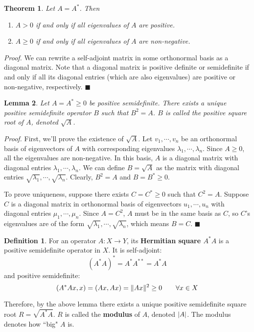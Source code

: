 \documentclass[a4paper,10pt]{book}
\theoremstyle{plain}
\newtheorem{theorem}{Theorem}[section]
\renewenvironment{proof}{\textsl{Proof.}}{\hfill$\blacksquare$}
\theoremstyle{plain}
\newtheorem{lemma}[theorem]{Lemma}
\newenvironment{lproof}{\textsl{Proof.}}{\hfill$\blacksquare$}
\theoremstyle{definition}
\newtheorem{definition}{Definition}[section]
\begin{document}
\begin{theorem}
Let $A = A^{*}$. Then 
\begin{enumerate}
	\item $A > 0$ if and only if all eigenvalues of $A$ are positive. 
	\item $A \geq 0$ if and only if all eigenvalues of $A$ are non-negative. 
\end{enumerate}
\end{theorem}

\begin{proof}
We can rewrite a self-adjoint matrix in some orthonormal basis as a diagonal matrix. Note that a diagonal matrix is positive definite or semidefinite if and only if all its diagonal entries (which are also eigenvalues) are positive or non-negative, respectively.  
\end{proof}

\begin{lemma}
Let $A = A^{*} \geq 0$ be positive semidefinite. There exists a unique positive semidefinite operator $B$ such that $B^{2} = A$. $B$ is called the positive square root of $A$, denoted $\sqrt{A}$.
\end{lemma}

\begin{lproof}
First, we'll prove the existence of $\sqrt{A}$. Let $v_{1}, \cdots, v_{n}$ be an orthonormal basis of eigenvectors of $A$ with corresponding eigenvalues $\lambda_{1}, \cdots, \lambda_{n}$. Since $A \geq 0$, all the eigenvalues are non-negative. In this basis, $A$ is a diagonal matrix with diagonal entries $\lambda_{1}, \cdots, \lambda_{n}$. We can define $B =\sqrt{A}$ as the matrix with diagonal entries $\sqrt{\lambda_{1}}, \cdots, \sqrt{\lambda_{n}}$. Clearly, $B^{2} = A$ and $B = B^{*} \geq 0$. 

To prove uniqueness, suppose there exists $C = C^{*} \geq 0$ such that $C^{2} = A$. Suppose $C$ is a diagonal matrix in orthonormal basis of eigenvectors $u_{1}, \cdots, u_{n}$ with diagonal entries $\mu_{1}, \cdots, \mu_{n}$. Since $A = C^{2}$, $A$ must be in the same basis as $C$, so $C$'s eigenvalues are of the form $\sqrt{\lambda_{1}}, \cdots, \sqrt{\lambda_{n}}$, which means $B = C$. 
\end{lproof}

\begin{definition}
For an operator $A: X \rightarrow Y$, its \textbf{Hermitian square $A^{*} A$} is a positive semidefinite operator in $X$. It is self-adjoint:
$$(A^{*} A)^{*} = A^{*} A^{**} = A^{*} A$$
and positive semidefinite:
$$(A^{*} Ax, x) = (Ax, Ax) = \lVert Ax\rVert^{2} \geq 0 \qquad \forall x \in X$$

Therefore, by the above lemma there exists a unique positive semidefinite square root $R = \sqrt{A^{*} A}$. $R$ is called the \textbf{modulus} of $A$, denoted $\lvert A\rvert$. The modulus denotes how ``big" $A$ is. 
\end{definition}
\end{document}
